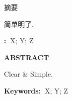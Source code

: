 \newpage
\pagestyle{empty}
\setcounter{page}{1}

\begin{center}
\LARGE\heiti{}摘要
\end{center}

简单明了.

\textbf{:~}X; Y; Z

\newpage
{}
\begin{center}
\LARGE\textbf{ABSTRACT}
\end{center}

Clear \& Simple.

\noindent\textbf{Keywords:~}X; Y; Z
